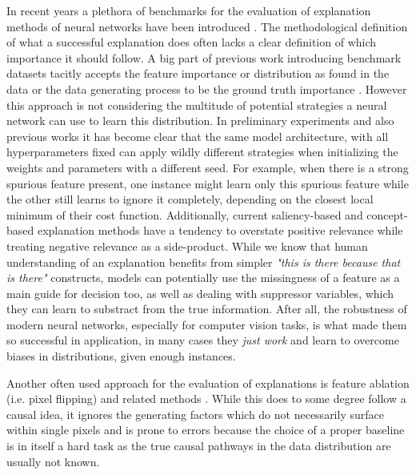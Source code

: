 In recent years a plethora of benchmarks for the evaluation of explanation methods of neural networks have been introduced .
The methodological definition of what a successful explanation does often lacks a clear definition of which importance it should follow. A big part of previous work introducing benchmark datasets tacitly accepts the feature importance or distribution as found in the data or the data generating process to be the ground truth importance . However this approach is not considering the multitude of potential strategies a neural network can use to learn this distribution.
In preliminary experiments and also previous works it has become clear that the same model architecture, with all hyperparameters fixed can apply wildly different strategies when initializing the weights and parameters with a different seed. For example, when there is a strong spurious feature present, one instance might learn only this spurious feature while the other still learns to ignore it completely, depending on the closest local minimum of their cost function.
Additionally, current saliency-based and concept-based explanation methods have a tendency to overstate positive relevance while treating negative relevance as a side-product. While we know that human understanding of an explanation benefits from simpler \textit{"this is there because that is there"} constructs, models can potentially use the missingness of a feature as a main guide for decision too, as well as dealing with suppressor variables, which they can learn to substract from the true information. After all, the robustness of modern neural networks, especially for computer vision tasks, is what made them so successful in application, in many cases they \textit{just work} and learn to overcome biases in distributions, given enough instances. 


Another often used approach for the evaluation of explanations is feature ablation (i.e. pixel flipping) and related methods \cite{Samek2017a, } . While this does to some degree follow a causal idea, it ignores the generating factors which do not necessarily surface within single pixels and is prone to errors because the choice of a proper baseline is in itself a hard task as the true causal pathways in the data distribution are usually not known. 


